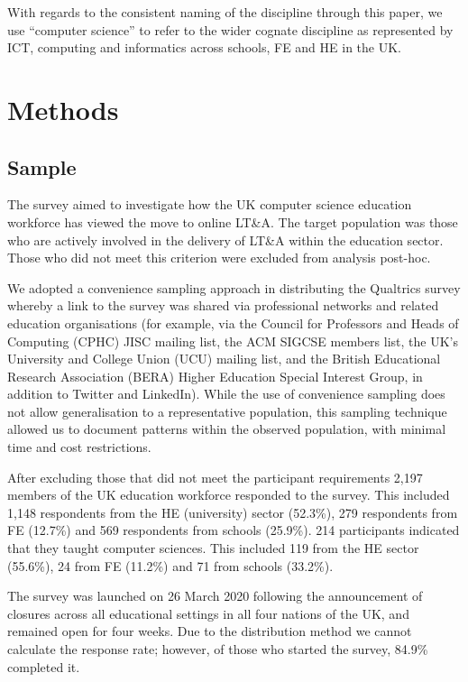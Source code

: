 \documentclass[sigconf]{acmart}
\begin{document}
With regards to the consistent naming of the discipline through this
paper, we use ``computer science'' to refer to the wider cognate
discipline as represented by ICT, computing and informatics across
schools, FE and HE in the UK.

\section{Methods}\label{methods}

\subsection{Sample}

The survey aimed to investigate how the UK computer science education
workforce has viewed the move to online LT\&A. The target population was
those who are actively involved in the delivery of LT\&A within the
education sector. Those who did not meet this criterion were excluded
from analysis post-hoc.

We adopted a convenience sampling approach in distributing the
Qualtrics survey whereby a link to the survey was shared via
professional networks and related education organisations (for
example, via the Council for Professors and Heads of Computing (CPHC)
JISC mailing list, the ACM SIGCSE members list, the UK's University
and College Union (UCU) mailing list, and the British Educational
Research Association (BERA) Higher Education Special Interest Group,
in addition to Twitter and LinkedIn). While the use of convenience
sampling does not allow generalisation to a representative population,
this sampling technique allowed us to document patterns within the
observed population, with minimal time and cost restrictions.

After excluding those that did not meet the participant requirements
2,197 members of the UK education workforce responded to the
survey. This included 1,148 respondents from the HE (university)
sector (52.3\%), 279 respondents from FE (12.7\%) and 569 respondents
from schools (25.9\%). 214 participants indicated that they taught
computer sciences. This included 119 from the HE sector (55.6\%), 24
from FE (11.2\%) and 71 from schools (33.2\%).

The survey was launched on 26 March 2020 following the announcement of
closures across all educational settings in all four nations of the
UK, and remained open for four weeks. Due to the distribution method
we cannot calculate the response rate; however, of those who started
the survey, 84.9\% completed it.
\end{document}
